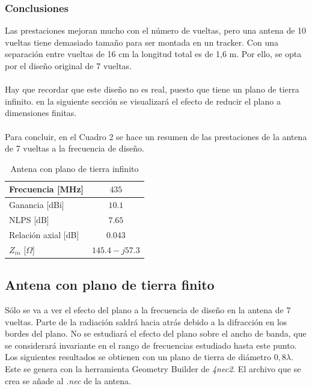 \documentclass[12pt]{article}
\begin{document}
\subsubsection*{Conclusiones}
Las prestaciones mejoran mucho con el número de vueltas, pero una antena de 10 vueltas tiene demasiado tamaño para ser montada en un tracker. Con una separación entre vueltas de 16 cm la longitud total es de 1,6 m. Por ello, se opta por el diseño original de 7 vueltas.\\\\
Hay que recordar que este diseño no es real, puesto que tiene un plano de tierra infinito. en la siguiente sección se visualizará el efecto de reducir el plano a dimensiones finitas.\\\\
Para concluir, en el Cuadro 2 se hace un resumen de las prestaciones de la antena de 7 vueltas a la frecuencia de diseño.\\

\begin{table}[!h]
	\centering
\begin{tabular}{lc}
	\hline 
	Frecuencia [MHz] & $435$ \\ 
	\hline 
	Ganancia [dBi] & $10.1$ \\ 
	\hline 
	NLPS [dB] & $7.65$ \\ 
	\hline 
	Relación axial [dB] & $0.043$ \\ 
	\hline 
	$Z_{in}$ [$\Omega$] & $145.4 - j57.3$ \\ 
	\hline 
\end{tabular} 
\caption{Antena con plano de tierra infinito}
\end{table} 
\newpage

\subsection{Antena con plano de tierra finito}
Sólo se va a ver el efecto del plano a la frecuencia de diseño en la antena de 7 vueltas. Parte de la radiación saldrá hacia atrás debido a la difracción en los bordes del plano. No se estudiará el efecto del plano sobre el ancho de banda, que se considerará invariante en el rango de frecuencias estudiado hasta este punto. Los siguientes resultados se obtienen con un plano de tierra de diámetro $0,8\lambda$. Este se genera con la herramienta Geometry Builder de \textit{4nec2}. El archivo que se crea se añade al \textit{.nec} de la antena.
\end{document}
